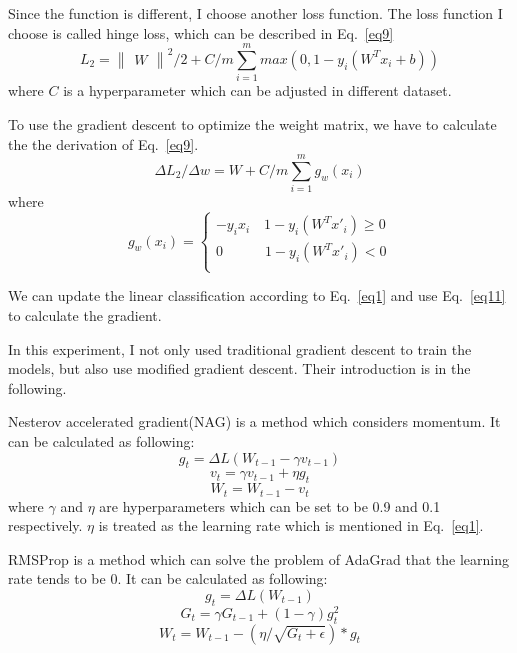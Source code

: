 \documentclass[journal, a4paper]{IEEEtran}
\begin{document}
Since the function is different, I choose another loss function. The loss function I choose is called hinge loss, which can be described in Eq.~\eqref{eq9}
\begin{equation}
L_2 = \begin{Vmatrix}W\end{Vmatrix}^2/2 + C/m \sum_{i=1}^m max(0, 1-y_i(W^Tx_i+b))
\label{eq9}
\end{equation}
where $C$ is a hyperparameter which can be adjusted in different dataset.

To use the gradient descent to optimize the weight matrix, we have to calculate the the derivation of Eq.~\eqref{eq9}.
\begin{equation}
\Delta L_2 / \Delta w = W + C/m\sum_{i=1}^m g_w(x_i)
\label{eq10}
\end{equation}
where
\begin{equation}
g_w(x_i)=\begin{cases}
-y_ix_i\quad 1-y_i(W^Tx'_i) \geq 0 \\
0\quad \quad \quad 1-y_i(W^Tx'_i) < 0 \\
\end{cases}
\label{eq11}
\end{equation}

We can update the linear classification according to Eq.~\eqref{eq1} and use Eq.~\eqref{eq11} to calculate the gradient.

In this experiment, I not only used traditional gradient descent to train the models, but also use modified gradient descent. Their introduction is in the following.

Nesterov accelerated gradient(NAG) is a method which considers momentum. It can be calculated as following:
\begin{equation}
g_t=\Delta L(W_{t-1} - \gamma v_{t-1}) \label{eq12}
\end{equation}
\begin{equation}
v_t = \gamma v_{t-1} + \eta g_t \label{eq13}
\end{equation}
\begin{equation}
W_t = W_{t-1} - v_t \label{eq14}
\end{equation}
where $\gamma$ and $\eta$ are hyperparameters which can be set to be 0.9 and 0.1 respectively. $\eta$ is treated as the learning rate which is mentioned in Eq.~\eqref{eq1}.

RMSProp is a method which can solve the problem of AdaGrad that the learning rate tends to be 0. It can be calculated as following:
\begin{equation}
g_t=\Delta L(W_{t-1}) \label{eq15}
\end{equation}
\begin{equation}
G_t = \gamma G_{t-1} + (1-\gamma)g_t^2 \label{eq16}
\end{equation}
\begin{equation}
W_t = W_{t-1} - (\eta / \sqrt{G_t+\epsilon}) * g_t \label{eq17}
\end{equation}
\end{document}
